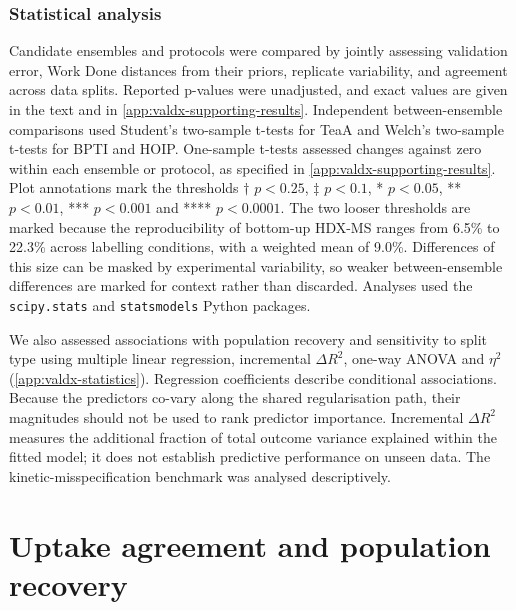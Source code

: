 \subsubsection{Statistical analysis}
\label{sec:valdx-statistics}

Candidate ensembles and protocols were compared by jointly assessing validation error, Work Done distances from their priors, replicate variability, and agreement across data splits. Reported p-values were unadjusted, and exact values are given in the text and in \cref{app:valdx-supporting-results}. Independent between-ensemble comparisons used Student's two-sample t-tests for TeaA and Welch's two-sample t-tests for BPTI and HOIP. One-sample t-tests assessed changes against zero within each ensemble or protocol, as specified in \cref{app:valdx-supporting-results}. Plot annotations mark the thresholds $\dagger$ $p<0.25$, $\ddagger$ $p<0.1$, * $p<0.05$, ** $p<0.01$, *** $p<0.001$ and **** $p<0.0001$. The two looser thresholds are marked because the reproducibility of bottom-up HDX-MS ranges from 6.5\% to 22.3\% across labelling conditions, with a weighted mean of 9.0\%.\supercite{hudgensInterlaboratoryComparisonHydrogenDeuterium2019} Differences of this size can be masked by experimental variability, so weaker between-ensemble differences are marked for context rather than discarded. Analyses used the \texttt{scipy.stats} and \texttt{statsmodels} Python packages.

We also assessed associations with population recovery and sensitivity to split type using multiple linear regression, incremental $\Delta R^2$, one-way ANOVA and $\eta^2$ (\cref{app:valdx-statistics}). Regression coefficients describe conditional associations. Because the predictors co-vary along the shared regularisation path, their magnitudes should not be used to rank predictor importance. Incremental $\Delta R^2$ measures the additional fraction of total outcome variance explained within the fitted model; it does not establish predictive performance on unseen data. The kinetic-misspecification benchmark was analysed descriptively.

\section{Uptake agreement and population recovery}
\label{sec:valdx-population-recovery}

